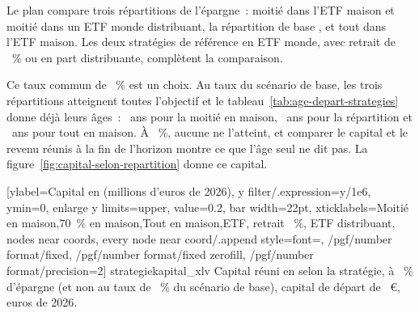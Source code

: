Le plan compare trois r\'epartitions de l'\'epargne~: moiti\'e dans l'ETF maison et moiti\'e dans un
ETF monde distribuant, la r\'epartition de base \ReferenzStrategie{}, et tout dans l'ETF maison. Les
deux strat\'egies de r\'ef\'erence en ETF monde, avec retrait de \TauxRetrait~\% ou en part
distribuante, compl\`etent la comparaison.


Ce taux commun de \SparquoteZwanzig~\% est un choix. Au taux du sc\'enario de base, les trois
r\'epartitions atteignent toutes l'objectif et le tableau~\ref{tab:age-depart-strategies} donne
d\'ej\`a leurs \^ages~: \AlterMaisonFuenfzigDreissig~ans pour la moiti\'e en maison,
\AlterYannBasis~ans pour la r\'epartition \ReferenzStrategie{} et \AlterMaisonHundertDreissig~ans pour
tout en maison. \`A \SparquoteZwanzig~\%, aucune ne l'atteint, et comparer le capital et le revenu
r\'eunis \`a la fin de l'horizon montre ce que l'\^age seul ne dit pas. La
figure~\ref{fig:capital-selon-repartition} donne ce capital.

[ylabel={Capital en \AnneeHorizonFin{} (millions d'euros de 2026)},
  y filter/.expression={y/1e6}, ymin=0, enlarge y limits={upper, value=0.2}, bar width=22pt,
  xticklabels={{Moiti\'e en maison},{70~\% en maison},{Tout en maison},{ETF, retrait \TauxRetrait~\%},
    {ETF distribuant}},
  nodes near coords, every node near coord/.append style={font=\scriptsize,
    /pgf/number format/fixed, /pgf/number format/fixed zerofill, /pgf/number format/precision=2}]%
  {strategie}{kapital_xlv}%
  {Capital r\'euni en \AnneeHorizonFin{} selon la strat\'egie, \`a \SparquoteZwanzig~\% d'\'epargne
  (et non au taux de \ReferenzSparquote~\% du sc\'enario de base), capital de d\'epart de
  \KapitalDepartMitte~€, euros de 2026.\label{fig:capital-selon-repartition}}

